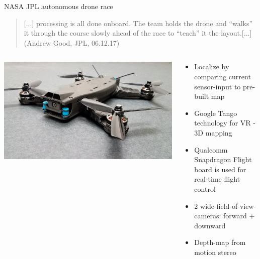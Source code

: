 \documentclass[aspectratio=169]{beamer}
\begin{document}
\begin{frame}{NASA JPL autonomous drone race}
	\begin{quote}
		[...] processing is all done onboard. The team holds the drone and “walks” it through the course slowly ahead of the race to “teach” it the layout.[...] \hfill (Andrew Good, JPL, 06.12.17)
	\end{quote}

	\begin{columns}
	\begin{column}{.3\textwidth}
		\centering
		\includegraphics[width=\textwidth]{images/jpl_drone.jpeg}	
	\end{column}
	
	\begin{column}{.7\textwidth}
	\begin{itemize}
		\item Localize by comparing current sensor-input to pre-built map
		\item Google Tango technology for VR - 3D mapping
		\item Qualcomm Snapdragon Flight board is used for real-time flight control
		\item 2 wide-field-of-view-cameras: forward + downward
		\item Depth-map from motion stereo
	\end{itemize}
	\end{column}
	\end{columns}
	
	\vspace{5mm}
	\color{gray}{https://www.nasa.gov/feature/jpl/drone-race-human-versus-artificial-intelligence}
\end{frame}
\end{document}
